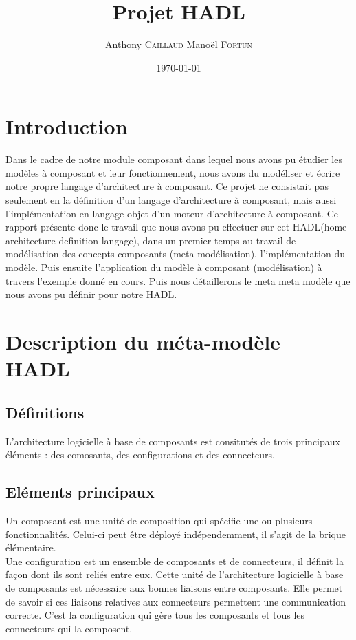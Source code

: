 \documentclass[11pt,a4paper]{article}
\title{Projet HADL}
\author{Anthony \textsc{Caillaud} Manoël \textsc{Fortun}}
\date{\today}
\begin{document}
\maketitle


\clearpage
\tableofcontents
\clearpage
\section{Introduction}

Dans le cadre de notre module composant dans lequel nous avons pu étudier les modèles à composant et leur fonctionnement, nous avons du modéliser et écrire notre propre langage d'architecture à composant. Ce projet ne consistait pas seulement en la définition d'un langage d'architecture à composant, mais aussi l'implémentation en langage objet d'un moteur d'architecture à composant. Ce rapport présente donc le travail que nous avons pu effectuer sur cet HADL(home architecture definition langage), dans un premier temps au travail de modélisation des concepts composants (meta modélisation), l'implémentation du modèle. Puis ensuite l'application du modèle à composant (modélisation) à travers l'exemple donné en cours. Puis nous détaillerons le meta meta modèle que nous avons pu définir pour notre HADL.


 
\section{Description du méta-modèle HADL}
\subsection{Définitions}
L'architecture logicielle à base de composants est consitutés de trois
principaux éléments : des comosants, des configurations et des connecteurs.\\

\subsection{ Eléments principaux}

 Un composant est une unité de composition qui spécifie
une ou plusieurs fonctionnalités. Celui-ci peut être déployé indépendemment, il s'agit de la brique élémentaire.\\

Une configuration est un ensemble de composants et de connecteurs, il définit la
façon dont ils sont reliés entre eux. Cette unité de l'architecture logicielle
à base de composants est nécessaire aux bonnes liaisons entre composants. Elle
permet de savoir si ces liaisons relatives aux connecteurs permettent une
communication correcte. C'est la configuration qui gère tous les composants et
tous les connecteurs qui la composent.\\
\end{document}
